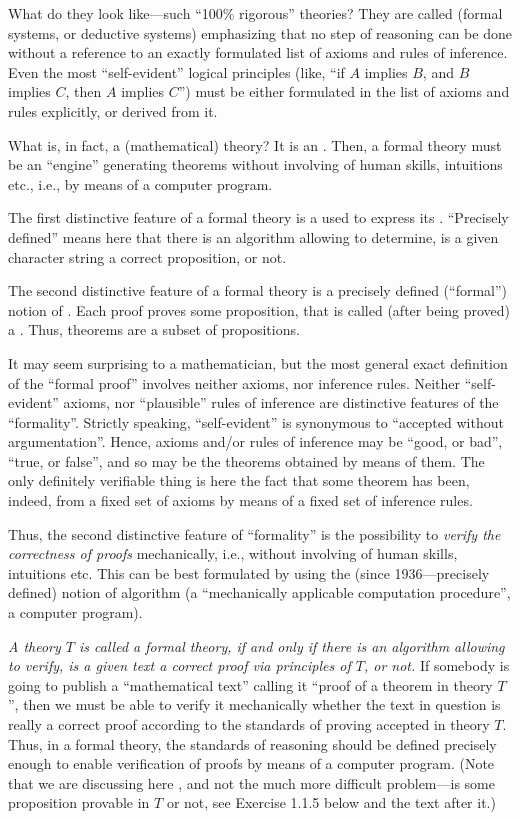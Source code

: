 What do they look like---such ``100\% rigorous'' theories?
They are called  (formal systems, or deductive systems) emphasizing that no step of reasoning can be done without a reference to an exactly formulated list of axioms and rules of inference.
Even the most ``self-evident'' logical principles (like, ``if \(A\) implies \(B\), and \(B\) implies \(C\), then \(A\) implies \(C\)'') must be either formulated in the list of axioms and rules explicitly, or derived from it.

What is, in fact, a (mathematical) theory?
It is an .
Then, a formal theory must be an ``engine'' generating theorems without involving of human skills, intuitions etc., i.e., by means of a computer program.

The first distinctive feature of a formal theory is a  used to express its .
``Precisely defined'' means here that there is an algorithm allowing to determine, is a given character string a correct proposition, or not.

The second distinctive feature of a formal theory is a precisely defined (``formal'') notion of .
Each proof proves some proposition, that is called (after being proved) a .
Thus, theorems are a subset of propositions.

It may seem surprising to a mathematician, but the most general exact definition of the ``formal proof'' involves neither axioms, nor inference rules.
Neither ``self-evident'' axioms, nor ``plausible'' rules of inference are distinctive features of the ``formality''.
Strictly speaking, ``self-evident'' is synonymous to ``accepted without argumentation''.
Hence, axioms and/or rules of inference may be ``good, or bad'', ``true, or false'', and so may be the theorems obtained by means of them.
The only definitely verifiable thing is here the fact that some theorem has been, indeed,  from a fixed set of axioms by means of a fixed set of inference rules.

Thus, the second distinctive feature of ``formality'' is the possibility to \emph{verify the correctness of proofs} mechanically, i.e., without involving of human skills, intuitions etc.
This can be best formulated by using the (since 1936---precisely defined) notion of algorithm (a ``mechanically applicable computation procedure'', a computer program).

\emph{A theory \(T\) is called a formal theory, if and only if there is an algorithm allowing to verify, is a given text a correct proof via principles of \(T\), or not.}
If somebody is going to publish a ``mathematical text'' calling it ``proof of a theorem in theory \(T\)'', then we must be able to verify it mechanically whether the text in question is really a correct proof according to the standards of proving accepted in theory \(T\).
Thus, in a formal theory, the standards of reasoning should be defined precisely enough to enable verification of proofs by means of a computer program.
(Note that we are discussing here , and not the much more difficult problem---is some proposition provable in \(T\) or not, see Exercise 1.1.5 below and the text after it.)

